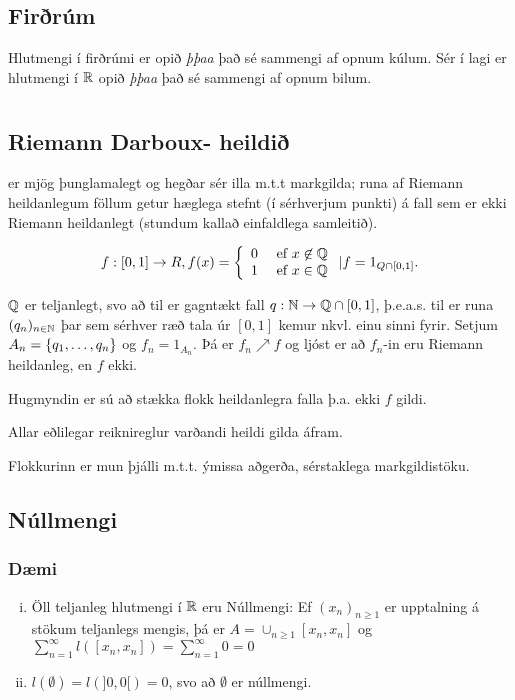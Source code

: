 \documentclass[12pt]{book}
\begin{document}
\section{Firðrúm}
Hlutmengi í firðrúmi er opið \emph{þþaa} það sé sammengi af opnum kúlum. Sér í lagi er hlutmengi í $\mathbb{R}$ opið \emph{þþaa} það sé sammengi af opnum bilum.

\chapter{}
\section{Riemann Darboux- heildið}
er mjög þunglamalegt og hegðar sér illa m.t.t markgilda; runa af Riemann heildanlegum föllum getur hæglega stefnt (í sérhverjum punkti) á fall sem er ekki Riemann heildanlegt (stundum kallað einfaldlega samleitið).

\begin{daemi}
\[f: [0,1] \to R, f(x) = \left\{ \begin{array}{l l} 0 & \text{ ef } x \not\in \mathbb{Q} \\ 1 & \text{ ef } x \in \mathbb{Q} \end{array} \right.  | f = 1_{Q \cap [0,1]}. \]

$\mathbb{Q}$ er teljanlegt, svo að til er gagntækt fall $q: \mathbb{N} \to \mathbb{Q} \cap [0,1]$, þ.e.a.s. til er runa $(q_n)_{n \in \mathbb{N}}$ þar sem sérhver ræð tala úr $[0,1]$ kemur nkvl. einu sinni fyrir. Setjum $A_n = \{q_1, \dotsc, q_n\}$ og $f_n = 1_{A_n}$. Þá er $f_n \nearrow f$ og ljóst er að $f_n$-in eru Riemann heildanleg, en $f$ ekki.

Hugmyndin er sú að stækka flokk heildanlegra falla þ.a. ekki $f$ gildi.

Allar eðlilegar reiknireglur varðandi heildi gilda áfram.

Flokkurinn er mun þjálli m.t.t. ýmissa aðgerða, sérstaklega markgildistöku.
\end{daemi}

\section{Núllmengi}
\subsection{Dæmi}
\begin{enumerate}[i)]
\item Öll teljanleg hlutmengi í $\mathbb{R}$ eru Núllmengi: Ef $(x_n)_{n \geq 1}$ er upptalning á stökum teljanlegs mengis, þá er $A = \cup_{n \geq 1} [x_n, x_n]$ og $\sum_{n = 1}^{\infty} l([x_n,x_n]) = \sum_{n=1}^{\infty} 0 = 0$
\item $l(\emptyset) = l(]0,0[) = 0$, svo að $\emptyset$ er núllmengi.
\end{enumerate}
\end{document}
